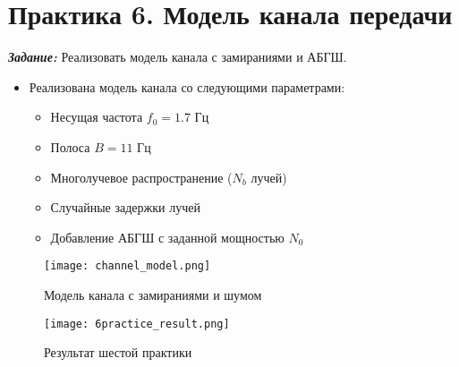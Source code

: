 \chapter*{Практика 6. Модель канала передачи}
\label{ch:6_practice}

\textit{\textbf{Задание:}} Реализовать модель канала с замираниями и АБГШ.

\begin{itemize}
    \item Реализована модель канала со следующими параметрами:
    \begin{itemize}
        \item Несущая частота $f_0 = 1.7$ Гц
        \item Полоса $B = 11$ Гц
        \item Многолучевое распространение ($N_b$ лучей)
        \item Случайные задержки лучей
        \item Добавление АБГШ с заданной мощностью $N_0$
    \end{itemize}
\end{itemize}

\begin{figure}[ht]
    \centering
    \texttt{[image: channel\_model.png]}
    \caption{Модель канала с замираниями и шумом}
    \label{fig:channel_model}
\end{figure}

\begin{figure}[ht]
    \centering
    \texttt{[image: 6practice\_result.png]}
    \caption{Результат шестой практики}
    \label{fig:6practice_result}
\end{figure}
